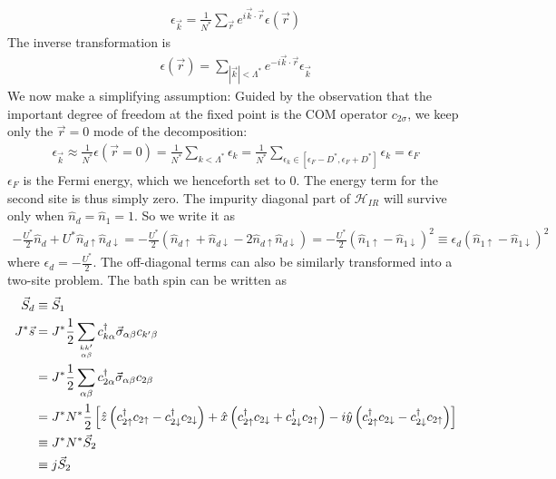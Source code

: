 \documentclass[twoside,11pt]{report}
\numberwithin{equation}{section}
\begin{document}
\begin{equation}\begin{aligned}
	\epsilon_{\vec{k}} = \frac{1}{N^*}\sum_{\vec r}e^{i \vec{k}\cdot\vec{r}}\epsilon(\vec r)
\end{aligned}\end{equation}
The inverse transformation is
\begin{equation}\begin{aligned}
	\epsilon(\vec r) = \sum_{|\vec k| < \Lambda^*}e^{-i \vec{k}\cdot\vec{r}}\epsilon_{\vec{k}}
\end{aligned}\end{equation}
We now make a simplifying assumption: Guided by the observation that the important degree of freedom at the fixed point is the COM operator \(c_{2\sigma}\), we keep only the \(\vec r=0\) mode of the decomposition:
\begin{equation}\begin{aligned}
	\epsilon_{\vec k} \approx \frac{1}{N^*}\epsilon(\vec r=0) = \frac{1}{N^*}\sum_{k<\Lambda^*}\epsilon_k = \frac{1}{N^*}\sum_{\epsilon_k \in [\epsilon_F - D^*, \epsilon_F + D^*]}\epsilon_k = \epsilon_F
\end{aligned}\end{equation}
\(\epsilon_F\) is the Fermi energy, which we henceforth set to 0. The energy term for the second site is thus simply zero. The impurity diagonal part of \(\mathcal{H}_{IR}\) will survive only when \(\hat n_d = \hat n_1 = 1\). So we write it as
\begin{equation}\begin{aligned}
	- \frac{U^*}{2}\hat n_d + U^* \hat n_{d\uparrow}\hat n_{d\downarrow} = - \frac{U^*}{2}\left(\hat n_{d\uparrow} + \hat n_{d \downarrow} - 2\hat n_{d\uparrow}\hat n_{d\downarrow}\right) = - \frac{U^*}{2} \left(\hat n_{1 \uparrow} - \hat n_{1 \downarrow}\right)^2 \equiv \epsilon_d \left(\hat n_{1 \uparrow} - \hat n_{1 \downarrow}\right)^2
\end{aligned}\end{equation}
where \(\epsilon_d = - \frac{U^*}{2}\). The off-diagonal terms can also be similarly transformed into a two-site problem. The bath spin can be written as
\begin{equation}\begin{aligned}
	\vec S_d &\equiv \vec S_1\\
	J^*\vec s &= J^* \frac{1}{2}\sum_{kk^\prime\atop{\alpha\beta}}c^\dagger_{k\alpha}\vec \sigma_{\alpha\beta}c_{k^\prime\beta} \\
	       &= J^*\frac{1}{2}\sum_{\alpha\beta}c^\dagger_{2\alpha}\vec \sigma_{\alpha\beta}c_{2\beta} \\
	       &= J^* N^* \frac{1}{2}\left[\hat z\left(c^\dagger_{2 \uparrow}c_{2 \uparrow} - c^\dagger_{2 \downarrow} c_{2 \downarrow} \right) + \hat x \left(c^\dagger_{2 \uparrow}c_{2 \downarrow} + c^\dagger_{2 \downarrow} c_{2 \uparrow} \right) -i \hat y \left( c^\dagger_{2 \uparrow}c_{2 \downarrow} - c^\dagger_{2 \downarrow} c_{2 \uparrow} \right)\right]\\
	       &\equiv J^*N^* \vec S_2\\
	       &\equiv j \vec S_2\\
\end{aligned}\end{equation}
\end{document}
